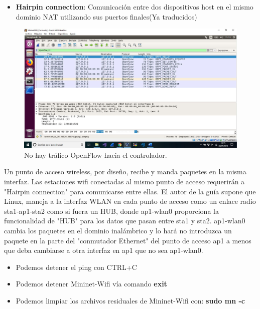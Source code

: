 \begin{itemize}
    \item \textbf{Hairpin connection}: Comunicación entre dos dispositivos host en el mismo dominio NAT utilizando sus puertos finales(Ya traducidos)
\end{itemize}
\newpage
\begin{figure}[!htb]
  \centering
    \includegraphics[width=\linewidth]{./img/test/8.JPG}
    \caption{No hay tráfico OpenFlow hacia el controlador.}
  \label{fig:yo}
\end{figure}
Un punto de acceso wireless, por diseño, recibe y manda paquetes en la misma interfaz. Las estaciones wifi conectadas al mismo punto de acceso requerirán a "Hairpin connection" para comunicarse entre ellas. El autor de la guía supone que Linux, maneja a la interfaz WLAN en cada punto de acceso como un enlace radio sta1-ap1-sta2 como si fuera un HUB, donde ap1-wlan0 proporciona la funcionalidad de "HUB"
para los datos que pasan entre sta1 y sta2.
ap1-wlan0 cambia los paquetes en el dominio inalámbrico y lo hará
no introduzca un paquete en la parte del "conmutador Ethernet" del punto de acceso ap1 a menos que deba cambiarse a
otra interfaz en ap1 que no sea ap1-wlan0.\newline
\newline
\begin{itemize}
    \item Podemos detener el ping con CTRL+C
    \item Podemos detener Mininet-Wifi vía comando \textbf{exit}
    \item Podemos limpiar los archivos residuales de Mininet-Wifi con:  \textbf{sudo mn -c}
\end{itemize}

